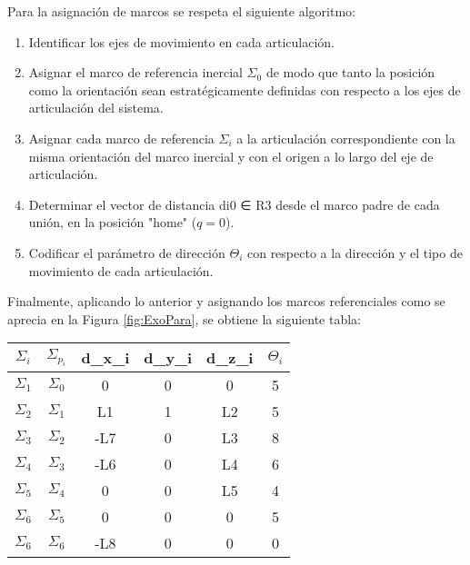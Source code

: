 \documentclass[journal, trans, spanish]{IEEEtran}
\begin{document}
Para la asignación de marcos se respeta el siguiente algoritmo:
\begin{enumerate}
\item Identificar los ejes de movimiento en cada articulación.
\item Asignar el marco de referencia inercial $\Sigma_0$ de modo que tanto la posición como la orientación sean estratégicamente definidas con respecto a los ejes de articulación del sistema.
\item Asignar cada marco de referencia $\Sigma_i$ a la articulación correspondiente con la misma orientación del marco inercial y con el origen a lo largo del eje de articulación.
\item Determinar el vector de distancia di0 ∈ R3 desde el marco padre de cada unión, en la posición "home" ($q = 0$).
\item Codificar el parámetro de dirección $\Theta _i$ con respecto a la dirección y el tipo de movimiento de cada articulación.
   
\end{enumerate}

\noindent Finalmente, aplicando lo anterior y asignando los marcos referenciales como se aprecia en la Figura \ref{fig:ExoPara}, se obtiene la siguiente tabla:

\begin{table}[!ht] %
\centering
\begin{center}
\begin{tabular}{cccccc}
$\Sigma_i$ & $\Sigma_p_i$ & d_x_i & d_y_i & d_z_i & $\Theta_i$\\
\hline \hline 
$\Sigma_1$ & $\Sigma_0$ & 0   & 0 & 0  & 5\\ 
$\Sigma_2$ & $\Sigma_1$ & L1  & 1 & L2 & 5\\
$\Sigma_3$ & $\Sigma_2$ & -L7 & 0 & L3 & 8\\
$\Sigma_4$ & $\Sigma_3$ & -L6 & 0 & L4 & 6\\
$\Sigma_5$ & $\Sigma_4$ & 0   & 0 & L5 & 4\\
$\Sigma_6$ & $\Sigma_5$ & 0   & 0 & 0  & 5\\
$\Sigma_6$ & $\Sigma_6$ & -L8 & 0 & 0  & 0\\
\end{tabular}
\end{center}
\end{table}
\end{document}
